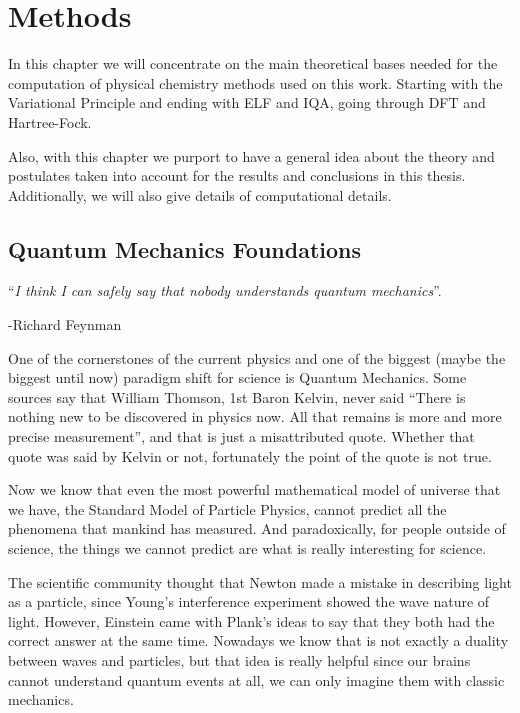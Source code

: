 \chapter{Methods}

In this chapter we will concentrate on the main theoretical bases needed for
the computation of physical chemistry methods used on this work. Starting with
the Variational Principle and ending with \gls{ELF} and IQA, going through
\gls{DFT} and Hartree-Fock.

Also, with this chapter we purport to have a general idea about the theory and
postulates taken into account for the results and conclusions in this thesis.
Additionally, we will also give details of computational details.

\section{Quantum Mechanics Foundations}

\begin{flushright}
  {\small
  ``{\em I think I can safely say that nobody
  understands quantum mechanics}''.
  
  -Richard Feynman
  }
\end{flushright}

\normalsize One of the cornerstones of the current physics and one of the
biggest (maybe the biggest until now) paradigm shift for science is Quantum
Mechanics.  Some sources say that William Thomson, 1st Baron Kelvin, never said
``There is nothing new to be discovered in physics now. All that remains is
more and more precise measurement'', and that is just a misattributed quote.
Whether that quote was said by Kelvin or not, fortunately the point of the
quote is not true.

Now we know that even the most powerful mathematical model of universe that we
have, the Standard Model of Particle Physics, cannot predict all the phenomena
that mankind has measured.  And paradoxically, for people outside of science,
the things we cannot predict are what is really interesting for science.

The scientific community thought that Newton made a mistake in describing light
as a particle, since Young's interference experiment showed the wave nature of
light. However, Einstein came with Plank's ideas \cite{Einstein1905} to say
that they both had the correct answer at the same time. Nowadays we know that
is not exactly a duality between waves and particles, but that idea is really
helpful since our brains cannot understand quantum events at all, we can only
imagine them with classic mechanics.


